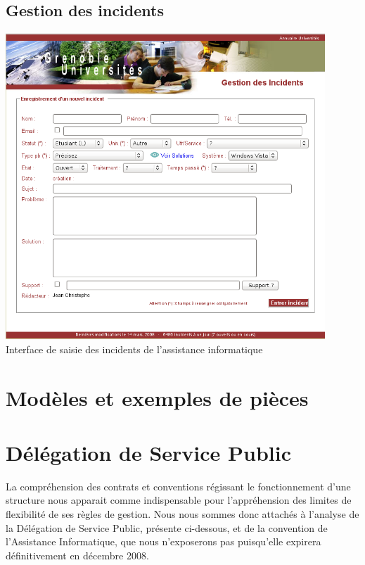\subsection{Gestion des incidents}
\label{gestion_incidents}
\begin{center}
	\includegraphics[width=12cm]{annexes/images/gestion_des_incidents.png} \\
	Interface de saisie des incidents de l'assistance informatique
\end{center}

\section{Modèles et exemples de pièces}

\section{Délégation de Service Public}

La compréhension des contrats et conventions régissant le fonctionnement d'une
structure nous apparait comme indispensable pour l'appréhension des limites de
flexibilité de ses règles de gestion. Nous nous sommes donc attachés à l'analyse
de la Délégation de Service Public, présente ci-dessous, et de la convention
de l'Assistance Informatique, que nous n'exposerons pas puisqu'elle expirera 
définitivement en décembre 2008.

\newpage
\begin{center}
	
\end{center}
